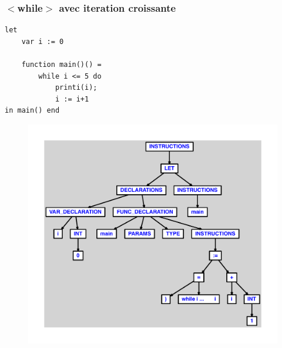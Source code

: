 \documentclass{article}
\begin{document}
\subsubsection{$ < $while$ > $ avec iteration croissante}
\begin{lstlisting}
let
	var i := 0

	function main()() =
		while i <= 5 do
			printi(i);
			i := i+1
in main() end
\end{lstlisting}
\newpage
\begin{figure}[H]
\centering
\includegraphics[max width=\textwidth]{ast/ast_329.pdf}
\end{figure}
\newpage
\end{document}
